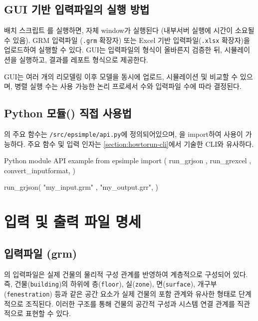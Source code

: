 \section{GUI 기반 입력파일의 실행 방법}
\label{section:howtorun-excellauncher}

배치 스크립트 를 실행하면, 자체 window가 실행된다 (내부서버 실행에 시간이 소요될 수 있음). GRM 입력파일 (\texttt{.grm} 확장자) 또는 Excel 기반 입력파일(\texttt{.xlsx} 확장자)을 업로드하여 \simulator \를 실행할 수 있다. GUI는 입력파일의 형식이 올바른지 검증한 뒤, 시뮬레이션을 실행하고, 결과를 레포트 형식으로 제공한다.

GUI는 여러 개의 리모델링 이후 모델을 동시에 업로드, 시뮬레이션 및 비교할 수 있으며, 병렬 실행 수는 사용 가능한 논리 프로세서 수와 입력파일 수에 따라 결정된다.


\section{Python 모듈(\pymodule) 직접 사용법}
\label{section:howtorun-pythonmodule}

\pymodule 의 주요 함수는 \texttt{/src/epsimple/api.py}에 정의되어있으며, \pymodule 을 import하여 사용이 가능하다. 주요 함수 및 입력 인자는 \ref{section:howtorun-cli}에서 기술한 CLI와 유사하다.

\begin{codeblock}{Python module API example}
from epsimple import (
  run_grjson         ,
  run_grexcel        ,
  convert_inputformat,
)

run_grjson(
  "my_input.grm" ,
  "my_output.grr",
)
\end{codeblock}


\chapter{입력 및 출력 파일 명세}

\section{입력파일 (grm)}
\label{section:format-explanation-grm}

\simulator 의 입력파일은 실제 건물의 물리적 구성 관계를 반영하여 계층적으로 구성되어 있다. 즉, 건물(\texttt{building})의 하위에 층(\texttt{floor}), 실(\texttt{zone}), 면(\texttt{surface}), 개구부(\texttt{fenestration}) 등과 같은 공간 요소가 실제 건물의 포함 관계와 유사한 형태로 단계적으로 조직된다. 이러한 구조를 통해 건물의 공간적 구성과 시스템 연결 관계를 직관적으로 표현할 수 있다.

